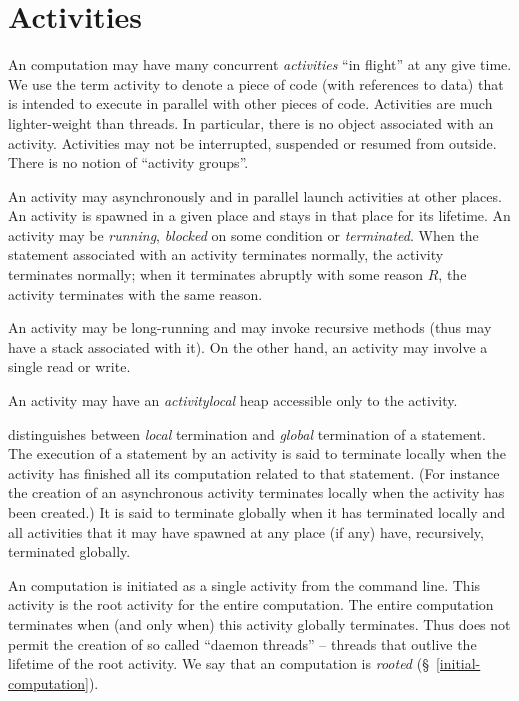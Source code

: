 \chapter{Activities}\label{XtenActivities}

An \Xten{} computation may have many concurrent {\em activities} ``in
flight'' at any give time. We use the term activity to denote a piece
of code (with references to data) that is intended to execute in
parallel with other pieces of code. Activities are much lighter-weight
than threads. In particular, there is no object associated with an
activity. Activities may not be interrupted, suspended or resumed from
outside. There is no notion of ``activity groups''. 

An activity may asynchronously and in parallel launch activities at
other places. An activity is spawned in a given place and stays in
that place for its lifetime.  An activity may be {\em running}, {\em
blocked} on some condition or {\em terminated}. When the statement
associated with an activity terminates normally, the activity
terminates normally; when it terminates abruptly with some reason $R$,
the activity terminates with the same reason.

An activity may be long-running and may invoke recursive methods (thus
may have a stack associated with it). On the other hand, an activity
may involve a single read or write.

An activity may have an {\em activitylocal} heap accessible only
to the activity. 

\Xten{} distinguishes between {\em local} termination and {\em global}
termination of a statement. The execution of a statement by an
activity is said to terminate locally when the activity has finished
all its computation related to that statement. (For instance the
creation of an asynchronous activity terminates locally when the
activity has been created.)  It is said to terminate globally when it
has terminated locally and all activities that it may have spawned at
any place (if any) have, recursively, terminated globally.

An \Xten{} computation is initiated as a single activity from the
command line. This activity is the root activity for the entire
computation. The entire computation terminates when (and only when)
this activity globally terminates. Thus \Xten{} does not permit the
creation of so called ``daemon threads'' -- threads that outlive the
lifetime of the root activity. We say that an \Xten{} computation is
{\em rooted} (\S~\ref{initial-computation}).

